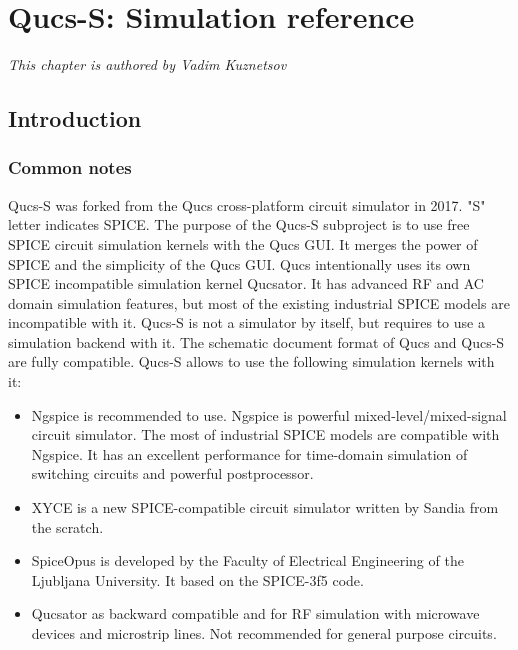 
\chapter{Qucs-S: Simulation reference}
\hfill\textsl{This chapter is authored by Vadim Kuznetsov}





\clearpage
\section{Introduction} \label{sec:refguide:intro}

\subsection{Common notes}

Qucs-S was forked from the Qucs cross-platform circuit simulator in 2017. "S" letter indicates SPICE. The purpose of the Qucs-S subproject is to use free SPICE circuit simulation kernels with the Qucs GUI. It merges the power of SPICE and the simplicity of the Qucs GUI. Qucs intentionally uses its own SPICE incompatible simulation kernel Qucsator. It has advanced RF and AC domain simulation features, but most of the existing industrial SPICE models are incompatible with it. Qucs-S is not a simulator by itself, but requires to use a simulation backend with it. The schematic document format of Qucs and Qucs-S are fully compatible. Qucs-S allows to use the following simulation kernels with it:

\begin{itemize}
 \item  Ngspice is recommended to use. Ngspice is powerful mixed-level/mixed-signal circuit simulator. The most of industrial SPICE models are compatible with Ngspice. It has an excellent performance for time-domain simulation of switching circuits and powerful postprocessor.
 \item XYCE is a new SPICE-compatible circuit simulator written by Sandia from the scratch.
 \item SpiceOpus is developed by the Faculty of Electrical Engineering of the Ljubljana University. It based on the SPICE-3f5 code.
 \item Qucsator as backward compatible and for RF simulation with microwave devices and microstrip lines. Not recommended for general purpose circuits.
\end{itemize}

